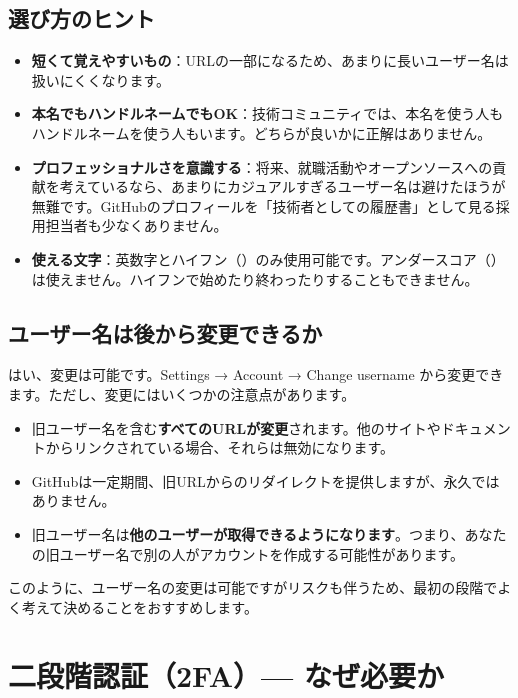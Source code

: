 \subsection{選び方のヒント}

\begin{itemize}
  \item \textbf{短くて覚えやすいもの}：URLの一部になるため、あまりに長いユーザー名は扱いにくくなります。
  \item \textbf{本名でもハンドルネームでもOK}：技術コミュニティでは、本名を使う人もハンドルネームを使う人もいます。どちらが良いかに正解はありません。
  \item \textbf{プロフェッショナルさを意識する}：将来、就職活動やオープンソースへの貢献を考えているなら、あまりにカジュアルすぎるユーザー名は避けたほうが無難です。GitHubのプロフィールを「技術者としての履歴書」として見る採用担当者も少なくありません。
  \item \textbf{使える文字}：英数字とハイフン（\cmd{-}）のみ使用可能です。アンダースコア（\cmd{\_}）は使えません。ハイフンで始めたり終わったりすることもできません。
\end{itemize}

\subsection{ユーザー名は後から変更できるか}

はい、変更は可能です。Settings → Account → Change username から変更できます。ただし、変更にはいくつかの注意点があります。

\begin{itemize}
  \item 旧ユーザー名を含む\textbf{すべてのURLが変更}されます。他のサイトやドキュメントからリンクされている場合、それらは無効になります。
  \item GitHubは一定期間、旧URLからのリダイレクトを提供しますが、永久ではありません。
  \item 旧ユーザー名は\textbf{他のユーザーが取得できるようになります}。つまり、あなたの旧ユーザー名で別の人がアカウントを作成する可能性があります。
\end{itemize}

このように、ユーザー名の変更は可能ですがリスクも伴うため、最初の段階でよく考えて決めることをおすすめします。

\section{二段階認証（2FA）— なぜ必要か}

